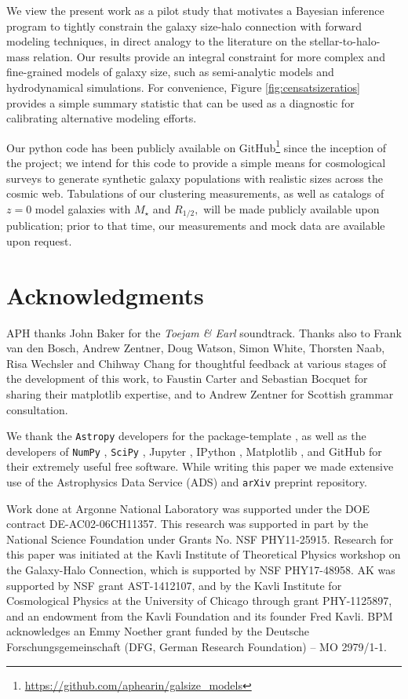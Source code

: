 \documentclass[usenatbib,usegraphicx,letterpaper]{mn2e}
\newcommand{\rhalf}{R_{1/2}}
\newcommand{\mstar}{M_{\star}}
\begin{document}
We view the present work as a pilot study that motivates a Bayesian inference program to tightly constrain the galaxy size-halo connection with forward modeling techniques, in direct analogy to the literature on the stellar-to-halo-mass relation.
Our results provide an integral constraint for more complex and fine-grained models of galaxy size, such as semi-analytic models and hydrodynamical simulations. For convenience, Figure \ref{fig:censatsizeratios} provides a simple summary statistic that can be used as a diagnostic for calibrating alternative modeling efforts.

Our python code has been publicly available on GitHub\footnote{\url{https://github.com/aphearin/galsize_models}} since the inception of the project; we intend for this code to provide a simple means for cosmological surveys to generate synthetic galaxy populations with realistic sizes across the cosmic web. Tabulations of our clustering measurements, as well as catalogs of $z=0$ model galaxies with $\mstar$ and $\rhalf,$ will be made publicly available upon publication; prior to that time, our measurements and mock data are available upon request.

\section*{Acknowledgments}

APH thanks John Baker for the {\em Toejam \& Earl} soundtrack. Thanks also to Frank van den Bosch, Andrew Zentner, Doug Watson, Simon White, Thorsten Naab, Risa Wechsler and Chihway Chang for thoughtful feedback at various stages of the development of this work, to Faustin Carter and Sebastian Bocquet for sharing their matplotlib expertise, and to Andrew Zentner for Scottish grammar consultation.

We thank the {\tt Astropy} developers for the package-template \citep{astropy}, as well as the developers of {\tt NumPy} \citep{numpy_ndarray}, {\tt SciPy} \citep{scipy}, Jupyter \citep{jupyter}, IPython \citep{ipython}, Matplotlib \citep{matplotlib}, and GitHub for their extremely useful free software. While writing this paper we made extensive use of the Astrophysics Data Service (ADS) and {\tt arXiv} preprint repository.

Work done at Argonne National Laboratory was supported under the DOE contract DE-AC02-06CH11357. This research was supported in part by the National Science Foundation under Grants No. NSF PHY11-25915. Research for this paper was initiated at the Kavli Institute of Theoretical Physics workshop on the Galaxy-Halo Connection, which is supported by NSF PHY17-48958. AK was supported by NSF grant  AST-1412107, and by the Kavli Institute for Cosmological Physics at the University of Chicago through grant PHY-1125897, and an endowment from the Kavli Foundation and its founder Fred Kavli. BPM acknowledges an Emmy Noether grant funded by the Deutsche Forschungsgemeinschaft (DFG, German Research Foundation) -- MO 2979/1-1.
\end{document}
